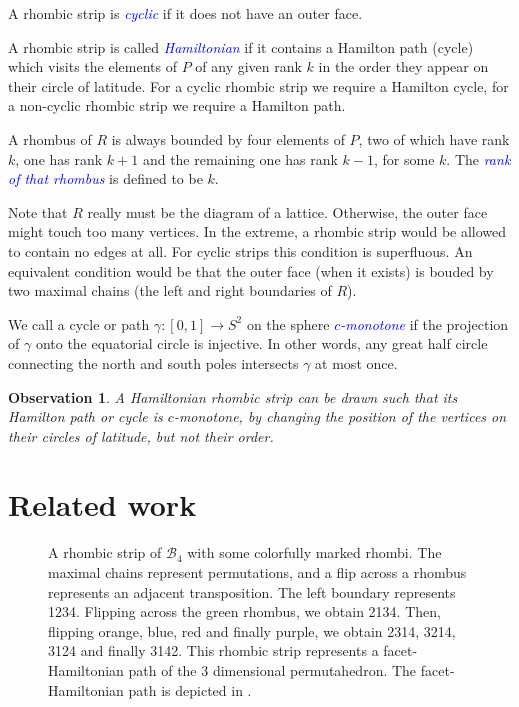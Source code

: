 \documentclass[fontsize=11pt,a4paper,DIV=12]{scrartcl}
\newcommand{\defn}[1]{\textsl{\textcolor{Blue}{#1}}}
\newtheorem{observation}[theorem]{Observation}
\begin{document}
A rhombic strip is \defn{cyclic} if it does not have an outer face.

A rhombic strip is called \defn{Hamiltonian} if it contains a Hamilton path (cycle) which visits the elements of $P$ of any given rank $k$ in the order they appear on their circle of latitude. For a cyclic rhombic strip we require a Hamilton cycle, for a non-cyclic rhombic strip we require a Hamilton path.

A rhombus of $R$ is always bounded by four elements of $P$, two of which have rank $k$, one has rank $k+1$ and the remaining one has rank $k-1$, for some $k$. The \defn{rank of that rhombus} is defined to be $k$.

Note that $R$ really must be the diagram of a lattice. Otherwise, the outer face might touch too many vertices. In the extreme, a rhombic strip would be allowed to contain no edges at all. For cyclic strips this condition is superfluous. An equivalent condition would be that the outer face (when it exists) is bouded by two maximal chains (the left and right boundaries of $R$).

We call a cycle or path $\gamma\colon[0,1]\to S^2$ on the sphere \defn{$c$-monotone} if the projection of $\gamma$ onto the equatorial circle is injective. In other words, any great half circle connecting the north and south poles intersects $\gamma$ at most once.
\begin{observation}
    A Hamiltonian rhombic strip can be drawn such that its Hamilton path or cycle is $c$-monotone, by changing the position of the vertices on their circles of latitude, but not their order.
\end{observation}

\section{Related work}\label{sec:related}

\begin{figure}
    \centering
    
    \caption{A rhombic strip of $\mathcal B_4$ with some colorfully marked rhombi. The maximal chains represent permutations, and a flip across a rhombus represents an adjacent transposition. The left boundary represents 1234. Flipping across the green rhombus, we obtain 2134. Then, flipping orange, blue, red and finally purple, we obtain 2314, 3214, 3124 and finally 3142. This rhombic strip represents a facet-Hamiltonian path of the 3 dimensional permutahedron. The facet-Hamiltonian path is depicted in .}
    \label{fig:rhombic to fh example}
\end{figure}
\end{document}
